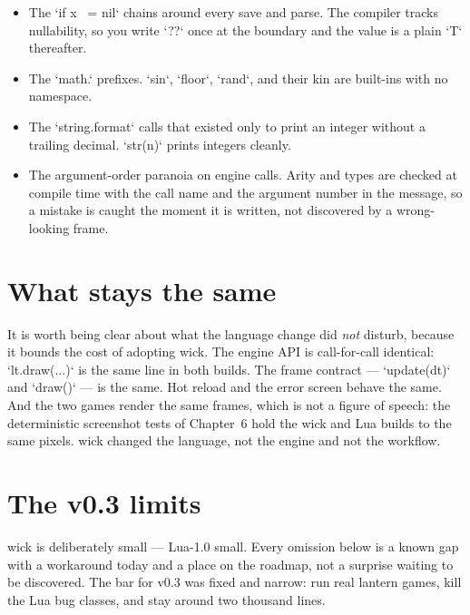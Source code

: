 \begin{itemize}
\item The `if x ~= nil` chains around every save and parse. The compiler
tracks nullability, so you write `??` once at the boundary and the value is a
plain `T` thereafter.
\item The `math.` prefixes. `sin`, `floor`, `rand`, and their kin are
built-ins with no namespace.
\item The `string.format` calls that existed only to print an integer without
a trailing decimal. `str(n)` prints integers cleanly.
\item The argument-order paranoia on engine calls. Arity and types are checked
at compile time with the call name and the argument number in the message, so
a mistake is caught the moment it is written, not discovered by a wrong-looking
frame.
\end{itemize}

\section{What stays the same}

It is worth being clear about what the language change did \emph{not} disturb,
because it bounds the cost of adopting wick. The engine API is call-for-call
identical: `lt.draw(...)` is the same line in both builds. The frame contract
--- `update(dt)` and `draw()` --- is the same. Hot reload and the error screen
behave the same. And the two games render the same frames, which is not a
figure of speech: the deterministic screenshot tests of Chapter~6 hold the
wick and Lua builds to the same pixels. wick changed the language, not the
engine and not the workflow.

\section{The v0.3 limits}

wick is deliberately small --- Lua-1.0 small. Every omission below is a known
gap with a workaround today and a place on the roadmap, not a surprise waiting
to be discovered. The bar for v0.3 was fixed and narrow: run real lantern
games, kill the Lua bug classes, and stay around two thousand lines.

